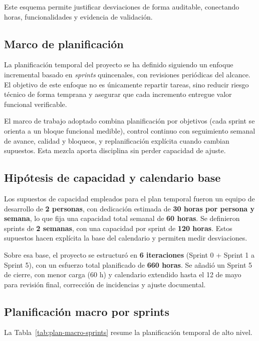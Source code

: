 Este esquema permite justificar desviaciones de forma auditable,
conectando horas, funcionalidades y evidencia de validaci\'on.

\subsection{Marco de planificaci\'on}

La planificaci\'on temporal del proyecto se ha definido siguiendo un enfoque incremental
basado en \emph{sprints} quincenales, con revisiones peri\'odicas del alcance.
El objetivo de este enfoque no es \'unicamente repartir tareas, sino reducir riesgo t\'ecnico
de forma temprana y asegurar que cada incremento entregue valor funcional verificable.

El marco de trabajo adoptado combina planificaci\'on por objetivos (cada sprint se orienta a un bloque funcional medible), control continuo con seguimiento semanal de avance, calidad y bloqueos, y replanificaci\'on expl\'icita cuando cambian supuestos. Esta mezcla aporta disciplina sin perder capacidad de ajuste.

\subsection{Hip\'otesis de capacidad y calendario base}

Los supuestos de capacidad empleados para el plan temporal fueron un equipo de desarrollo de \textbf{2 personas}, con dedicaci\'on estimada de \textbf{30 horas por persona y semana}, lo que fija una capacidad total semanal de \textbf{60 horas}. Se definieron sprints de \textbf{2 semanas}, con una capacidad por sprint de \textbf{120 horas}. Estos supuestos hacen expl\'icita la base del calendario y permiten medir desviaciones.

Sobre esa base, el proyecto se estructur\'o en \textbf{6 iteraciones} (Sprint 0 + Sprint 1 a Sprint 5),
con un esfuerzo total planificado de \textbf{660 horas}.
Se a\~nadi\'o un Sprint 5 de cierre, con menor carga (60 h) y calendario extendido
hasta el 12 de mayo para revisi\'on final, correcci\'on de incidencias y ajuste documental.

\subsection{Planificaci\'on macro por sprints}

La Tabla~\ref{tab:plan-macro-sprints} resume la planificaci\'on temporal de alto nivel.

